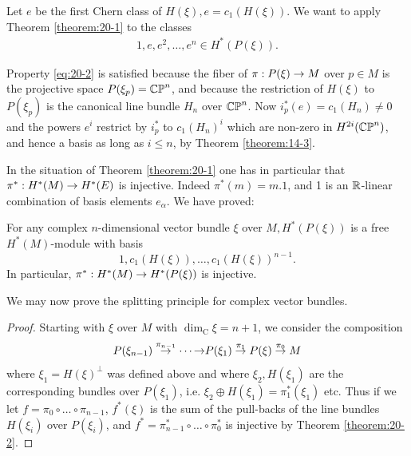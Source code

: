 Let $e$ be the first Chern class of $H( \xi ),e = {c}_{1}( {H( \xi ) })$. We want to apply Theorem \ref{theorem:20-1} 
to the classes
\begin{align}\label{eq:20-5}
  1,e,{e}^{2},\ldots,{e}^{n} \in  H^*( {P( \xi ) }).
\end{align}

Property \eqref{eq:20-2} is satisfied because the fiber of $\pi: P( \xi )  \rightarrow  M$ over $p \in  M$ is the projective 
space $P( {\xi_p})  = {\mathbb{CP}^n}$, and because the restriction of $H( \xi )$ to $P( {\xi_p})$ is the canonical 
line bundle $H_{n}$ over ${\mathbb{CP}^n}$. Now ${i}_{p}^*( e)  = {c}_{1}( H_{n})  \neq  0$ and the powers ${e}^{i}$ 
restrict by ${i}_{p}^*$ to ${c}_{1}{( H_{n}) }^{i}$ which are non-zero in $H^{2i}( {\mathbb{CP}^n})$, and hence a basis
as long as $i \leq  n$, by Theorem \ref{theorem:14-3}.

In the situation of Theorem \ref{theorem:20-1} one has in particular that ${\pi }^* : H^*( M)  \rightarrow  H^*( E)$ is injective. 
Indeed ${\pi }^*( m)  = {m.1}$, and 1 is an $\mathbb{R}$-linear combination of basis elements ${e}_{\alpha }$. 
We have proved:

\begin{theorem}\label{theorem:20-2}
  For any complex $n$-dimensional vector bundle $\xi$ over $M,H^*( {P( \xi ) })$ is a free $H^*(M)$-module with basis
  \[
    1,{c}_{1}( {H( \xi ) }),\ldots,{c}_{1}{( H( \xi ) ) }^{n- 1}.
  \]
  In particular, ${\pi }^* : H^*( M)  \rightarrow  H^*( {P( \xi ) })$ is injective.
\end{theorem}

We may now prove the splitting principle for complex vector bundles.

\begingroup
\def\proofname{\textup{\bfseries Proof of Theorem \ref{theorem:18-10}}} 
\begin{proof}
  Starting with $\xi$ over $M$ with ${\dim }_{\mathrm{C}}\xi  = n + 1$, we consider the composition
  \[
    P( {\xi }_{n- 1}) \overset{{\pi }_{n- 1}}
    { \rightarrow } \cdots  
    { \rightarrow}  P( {\xi }_{1}) \overset{{\pi }_{1}}
    { \rightarrow  }P( \xi ) \overset{{\pi }_{0}}
    { \rightarrow  }M
  \]
  where ${\xi }_{1} = H{( \xi ) }^{ \bot  }$ was defined above and where ${\xi }_{2},H( {\xi }_{1})$ are 
  the corresponding bundles over $P( {\xi }_{1})$, i.e. ${\xi }_{2} \oplus  H( {\xi }_{1})  = {\pi }_{1}^*( {\xi }_{1})$ 
  etc. Thus if we let $f = {\pi }_{0} \circ  \ldots  \circ  {\pi }_{n- 1}$, ${f}^*( \xi )$ is the sum of 
  the pull-backs of the line bundles $H( {\xi }_{i})$ over $P( {\xi }_{i})$, and ${f}^* = {\pi }_{n- 1}^* \circ  \ldots  \circ  {\pi }_{0}^*$ 
  is injective by Theorem \ref{theorem:20-2}.
\end{proof}
\endgroup

